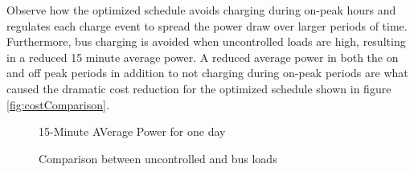 	\par Observe how the optimized schedule avoids charging during on-peak hours and regulates each charge event to spread the power draw over larger periods of time. Furthermore, bus charging is avoided when uncontrolled loads are high, resulting in a reduced 15 minute average power.  A reduced average power in both the on and off peak periods in addition to not charging during on-peak periods are what caused the dramatic cost reduction for the optimized schedule shown in figure \ref{fig:costComparison}.

\begin{figure*}
	\centering
	\caption{15-Minute AVerage Power for one day}
	\label{fig:totalPower1}
\end{figure*} 
\begin{figure*}
	\centering
	\caption{Comparison between uncontrolled and bus loads}
	\label{fig:powerPlot1}
\end{figure*}

